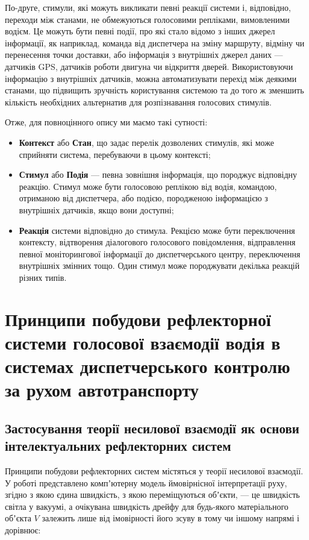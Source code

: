 По-друге, стимули, які можуть викликати певні реакції системи і, відповідно, переходи між станами, не обмежуються голосовими репліками, вимовленими водієм. Це можуть бути певні події, про які стало відомо з інших джерел інформації, як наприклад, команда від диспетчера на зміну маршруту, відміну чи перенесення точки доставки, або інформація з внутрішніх джерел даних --- датчиків GPS, датчиків роботи двигуна чи відкриття дверей. Використовуючи інформацію з внутрішніх датчиків, можна автоматизувати перехід між деякими станами, що підвищить зручність користування системою та до того ж зменшить кількість необхідних альтернатив для розпізнавання голосових стимулів.

Отже, для повноцінного опису ми маємо такі сутності:

\begin{itemize}
	\item \textbf{Контекст} або \textbf{Стан}, що задає перелік дозволених стимулів, які може сприйняти система, перебуваючи в цьому контексті;
	\item \textbf{Стимул} або \textbf{Подія} --- певна зовнішня інформація, що породжує відповідну реакцію. Стимул може бути голосовою реплікою від водія, командою, отриманою від диспетчера, або подією, породженою інформацією з внутрішніх датчиків, якщо вони доступні;
	\item \textbf{Реакція} системи відповідно до стимула. Рекцією може бути переключення контексту, відтворення діалогового голосового повідомлення, відправлення певної моніторингової інформації до диспетчерського центру,  переключення внутрішніх змінних тощо. Один стимул може породжувати декілька реакцій різних типів.
\end{itemize}


\section{Принципи побудови рефлекторної системи голосової взаємодії водія в системах диспетчерського контролю за рухом автотранспорту} \label{sect2_4}

\subsection{Застосування теорії несилової взаємодії як основи інтелектуальних рефлекторних систем} \label{subsect2_4_1}

Принципи побудови рефлекторних систем містяться у теорії несилової взаємодії. У роботі \cite{Teslia_2010} представлено компʼютерну модель ймовірнісної інтерпретації руху, згідно з якою єдина швидкість, з якою переміщуються обʼєкти, --- це швидкість світла у вакуумі, а очікувана швидкість дрейфу для будь-якого матеріального обʼєкта $V$ залежить лише від імовірності його зсуву в тому чи іншому напрямі і дорівнює:

